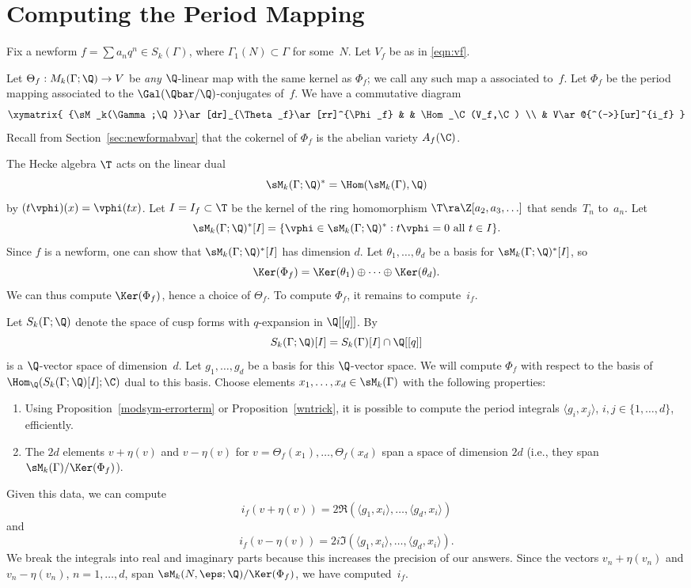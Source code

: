 \section{Computing the Period Mapping}\label{sec:computephi}%
%
Fix a newform $f=\sum a_nq^n\in S_k(\Gamma)$, 
where $\Gamma_1(N)\subset \Gamma$
for some~$N$.
Let $V_f$ be as in \eqref{eqn:vf}.


Let $\Theta_f:M_k(\Gamma;\Q) \to V$ be {\em any} $\Q$-linear map with the same kernel
as $\Phi_f$; we call any such map a 
associated to~$f$.  Let $\Phi_f$ be the period mapping associated
to the $\Gal(\Qbar/\Q)$-conjugates of~$f$.  We
have a commutative diagram
$$\xymatrix{
 {\sM_k(\Gamma;\Q)}\ar[dr]_{\Theta_f}\ar[rr]^{\Phi_f} 
   &          & \Hom_\C(V_f,\C) \\
    &     V\ar@{^(->}[ur]^{i_f}
}
$$
Recall from Section~\ref{sec:newformabvar} that the cokernel of
$\Phi_f$ is the abelian variety $A_f(\C)$.

The Hecke algebra $\T$ acts on the linear dual
$$\sM_k(\Gamma;\Q)^* = \Hom (\sM_k(\Gamma), \Q)$$
by $(t \vphi)(x) = \vphi(tx)$.
Let $I=I_f\subset \T$ be the kernel of the 
ring homomorphism $\T\ra \Z[a_2, a_3, \ldots]$ that sends~$T_n$ to~$a_n$. 
Let $$ 
  \sM_k(\Gamma;\Q)^*[I] = \{\vphi \in \sM_k(\Gamma;\Q)^* : t \vphi = 
   0 \text{ all }t \in I\}.
$$
Since $f$ is a newform, one can show that
$\sM_k(\Gamma;\Q)^*[I]$ has dimension $d$.
Let $\theta_1, \ldots, \theta_d$ be a basis
for $\sM_k(\Gamma;\Q)^*[I]$, so
$$
  \Ker(\Phi_f) = \Ker(\theta_1) \oplus \cdots \oplus \Ker(\theta_d).
$$
We can thus compute $\Ker(\Phi_f)$, hence a choice of $\Theta_f$.
To compute $\Phi_f$, it remains to compute~$i_f$. 

Let $S_k(\Gamma;\Q)$ denote the space of cusp forms with
$q$-expansion in $\Q[[q]]$.  
By 
$$
  S_k(\Gamma; \Q)[I] = S_k(\Gamma)[I] \cap \Q[[q]]
$$
is a $\Q$-vector space of dimension~$d$.
Let $g_1,\ldots,g_d$ be a basis for this $\Q$-vector space.
We will compute $\Phi_f$ with respect to the basis of
$\Hom_\Q(S_k(\Gamma;\Q)[I];\C)$ dual to this basis. 
Choose elements $x_1,\ldots,x_d\in \sM_k(\Gamma)$
with the following properties:
\begin{enumerate}
\item Using Proposition~\ref{modsym-errorterm} or Proposition~\ref{wntrick},
it is possible to compute the period integrals 
$\langle g_i, x_j \rangle$, $i,j\in\{1,\ldots, d\}$,
efficiently.
\item The $2d$ elements $v+\eta(v)$ and $v-\eta(v)$ for $v=\Theta_f(x_1),\ldots,\Theta_f(x_d)$ 
span a space of dimension $2d$ (i.e., they span $\sM_k(\Gamma)/\Ker(\Phi_f)$).
\end{enumerate}
Given this data, we can compute
$$i_f (v+\eta(v)) = 
   2\Re(\langle g_1, x_i\rangle, \ldots, \langle g_d, x_i\rangle)$$
and
$$i_f(v-\eta(v)) = 
   2i\Im(\langle g_1, x_i\rangle, \ldots, \langle g_d, x_i\rangle).$$
We break the integrals into real and imaginary parts because this
increases the precision of our answers.
Since the vectors $v_n+\eta(v_n)$ and $v_n-\eta(v_n)$, $n=1,\ldots,d$, span 
$\sM_k(N,\eps;\Q)/\Ker(\Phi_f)$,  we have computed~$i_f$. 

